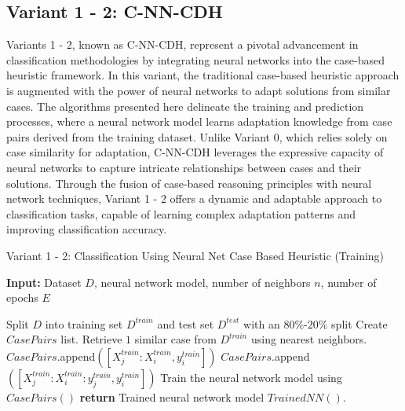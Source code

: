 \documentclass[a4paper, 12pt]{report}
\begin{document}
\subsection{Variant 1 - 2: C-NN-CDH}

Variants 1 - 2, known as C-NN-CDH, represent a pivotal advancement in classification methodologies by integrating neural networks into the case-based heuristic framework. 
In this variant, the traditional case-based heuristic approach is augmented with the power of neural networks to adapt solutions from similar cases. 
The algorithms presented here delineate the training and prediction processes, where a neural network model learns adaptation knowledge from case pairs derived from the training dataset. 
Unlike Variant 0, which relies solely on case similarity for adaptation, C-NN-CDH leverages the expressive capacity of neural networks to capture intricate relationships between cases and their solutions. 
Through the fusion of case-based reasoning principles with neural network techniques, Variant 1 - 2 offers a dynamic and adaptable approach to classification tasks, capable of learning complex adaptation patterns and improving classification accuracy.

\begin{algorithm}
    \caption{Variant 1 - 2: Classification Using Neural Net Case Based Heuristic (Training)}
    \label{alg:Classification_Varient1_2_using_CBH_train_alg7}
    \textbf{Input:} Dataset $D$, neural network model, number of neighbors $n$, number of epochs $E$
    \begin{algorithmic}
        \State Split $D$ into training set $D^{train}$ and test set $D^{test}$ with an $80\%$-$20\%$ split
        \State Create $CasePairs$ list.
            \State Retrieve $1$ similar case from $D^{train}$ using nearest neighbors.
                    \State $CasePairs$.append$([X^{train}_j:X^{train}_i, y^{train}_i])$
                \Else
                        \State $CasePairs$.append$([X^{train}_j:X^{train}_i:y^{train}_j, y^{train}_i])$
                    \EndIf
                \EndIf
            \EndFor
        \EndFor
        \State Train the neural network model using $CasePairs()$
        \State \textbf{return} Trained neural network model $Trained NN()$.
    \end{algorithmic}
\end{algorithm}
\end{document}
